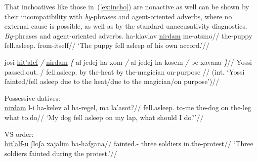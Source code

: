 That inchoatives like those in~(\ref{ex:incho}) are nonactive as well can be shown by their incompatibility with \emph{by}-phrases and agent-oriented adverbs, where no external cause is possible, as well as by the standard unaccusativity diagnostics.
\pex \emph{By}-phrases and agent-oriented adverbs.
		\a \begingl
		\gla ha-klavlav \underline{nirdam} me-atsmo//
		\glb the-puppy fell.asleep. from-itself//
		\glft `The puppy fell asleep of his own accord.'//
		\endgl
		
		\a \ljudge{*} \begingl
			\gla josi \underline{hit'alef} \emph{/} \underline{nirdam} \emph{\{} al-jedej ha-xom \emph{/} al-jedej ha-kosem \emph{/} be-xavana \emph{\}}//
			\glb Yossi passed.out. / fell.asleep. {} by the-heat {} by the-magician {} on-purpose {}//
			\glft (int. `Yossi fainted/fell asleep due to the heat/due to the magician/on purpose')//
		\endgl
\xe

\ex Possessive datives:\\
	\begingl
	\gla \underline{nirdam} l-i ha-kelev al ha-regel, ma la'asot?//
	\glb fell.asleep. to-me the-dog on the-leg what to.do//
	\glft `My dog fell asleep on my lap, what should I do?'//
	\endgl
\xe

\ex VS order:\\
	\begingl
	\gla \underline{hit'alf-u} ʃloʃa xajalim ba-hafgana//
	\glb fainted.- three soldiers in.the-protest//
	\glft `Three soldiers fainted during the protest.'//
	\endgl
\xe

